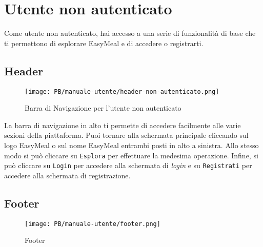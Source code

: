 \section{Utente non autenticato}
Come utente non autenticato, hai accesso a una serie di funzionalità di base che 
ti permettono di esplorare EasyMeal e di accedere o registrarti.

\subsection{Header}

\begin{figure}[htbp]
    \centering
	\texttt{[image: PB/manuale-utente/header-non-autenticato.png]}
    \caption{Barra di Navigazione per l'utente non autenticato}
\end{figure}

La barra di navigazione in alto ti permette di accedere facilmente alle varie 
sezioni della piattaforma. 
Puoi tornare alla schermata principale cliccando sul logo EasyMeal o sul nome 
EasyMeal entrambi posti in alto a sinistra. Allo stesso modo si può cliccare su
\texttt{Esplora} per effettuare la medesima operazione. Infine, si può cliccare
su \texttt{Login} per accedere alla schermata di \textit{login} e su 
\texttt{Registrati} per accedere alla schermata di registrazione.

\subsection{Footer}

\begin{figure}[htbp]
    \centering
	\texttt{[image: PB/manuale-utente/footer.png]}
    \caption{Footer}
\end{figure}

